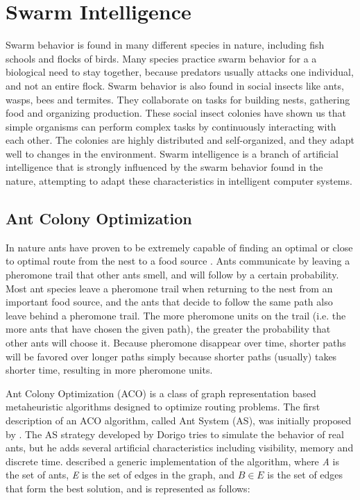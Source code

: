 \section{Swarm Intelligence}
\label{sec:swarmIntelligence}
Swarm behavior is found in many different species in nature, including fish schools and flocks of birds. Many species practice swarm behavior for a a biological need to stay together, because predators usually attacks one individual, and not an entire flock. Swarm behavior is also found in social insects like ants, wasps, bees and termites. They collaborate on tasks for building nests, gathering food and organizing production. These social insect colonies have shown us that simple organisms can perform complex tasks by continuously interacting with each other. The colonies are highly distributed and self-organized, and they adapt well to changes in the environment. Swarm intelligence \citep{beni89} is a branch of artificial intelligence that is strongly influenced by the swarm behavior found in the nature, attempting to adapt these characteristics in intelligent computer systems.

\subsection{Ant Colony Optimization}
In nature ants have proven to be extremely capable of finding an optimal or close to optimal route from the nest to a food source \citep{deneubourg90}. Ants communicate by leaving a pheromone trail that other ants smell, and will follow by a certain probability. Most ant species leave a pheromone trail when returning to the nest from an important food source, and the ants that decide to follow the same path also leave behind a pheromone trail. The more pheromone units on the trail (i.e. the more ants that have chosen the given path), the greater the probability that other ants will choose it. Because pheromone disappear over time, shorter paths will be favored over longer paths simply because shorter paths (usually) takes shorter time, resulting in more pheromone units. 

Ant Colony Optimization (ACO) is a class of graph representation based metaheuristic algorithms designed to optimize routing problems. The first description of an ACO algorithm, called Ant System (AS), was initially proposed by \citet{dorigo96}. The AS strategy developed by Dorigo tries to simulate the behavior of real ants, but he adds several artificial characteristics including visibility, memory and discrete time. \citet{nanda11} described a generic implementation of the algorithm, where \textit{A} is the set of ants, \textit{E} is the set of edges in the graph, and $B \in E$ is the set of edges that form the best solution, and is represented as follows: \\

